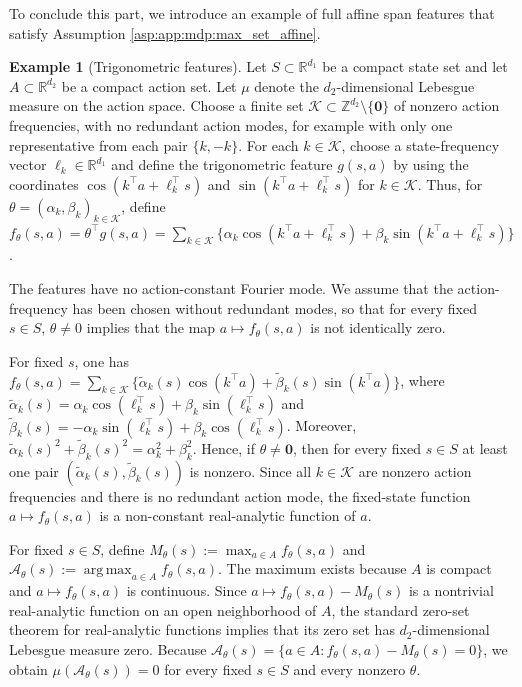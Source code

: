 \documentclass{amsart}
\theoremstyle{definition}
\newtheorem{example}{Example}
\begin{document}
To conclude this part, we introduce an example of full affine span features that satisfy Assumption \ref{asp:app:mdp:max_set_affine}. 

\begin{example}[Trigonometric features]\label{ex:trig_func_mdp}
Let $S\subset\mathbb R^{d_1}$ be a compact state set and let $A\subset\mathbb R^{d_2}$ be a compact action set. 
Let $\mu$ denote the $d_2$-dimensional Lebesgue measure on the action space. 
Choose a finite set $\mathcal K\subset\mathbb Z^{d_2}\setminus\{\mathbf 0\}$ of nonzero action frequencies, with no redundant action modes, for example with only one representative from each pair $\{k,-k\}$. 
For each $k\in\mathcal K$, choose a state-frequency vector $\ell_k\in\mathbb R^{d_1}$ and define the trigonometric feature $g(s,a)$ by using the coordinates $\cos(k^\top a+\ell_k^\top s)$ and $\sin(k^\top a+\ell_k^\top s)$ for $k\in\mathcal K$. 
Thus, for $\theta=(\alpha_k,\beta_k)_{k\in\mathcal K}$, define
$f_\theta(s,a)=\theta^\top g(s,a)=\sum_{k\in\mathcal K}\{\alpha_k\cos(k^\top a+\ell_k^\top s)+\beta_k\sin(k^\top a+\ell_k^\top s)\}$.

The features have no action-constant Fourier mode. 
We assume that the action-frequency has been chosen without redundant modes, so that for every fixed $s\in S$, $\theta\neq0$ implies that the map $a\mapsto f_\theta(s,a)$ is not identically zero. 

For fixed $s$, one has $f_\theta(s,a)=\sum_{k\in\mathcal K}\{\widetilde\alpha_k(s)\cos(k^\top a)+\widetilde\beta_k(s)\sin(k^\top a)\}$, where $\widetilde\alpha_k(s)=\alpha_k\cos(\ell_k^\top s)+\beta_k\sin(\ell_k^\top s)$ and $\widetilde\beta_k(s)=-\alpha_k\sin(\ell_k^\top s)+\beta_k\cos(\ell_k^\top s)$. 
Moreover, $\widetilde\alpha_k(s)^2+\widetilde\beta_k(s)^2=\alpha_k^2+\beta_k^2$. 
Hence, if $\theta\neq \mathbf 0$, then for every fixed $s\in S$ at least one pair $(\widetilde\alpha_k(s),\widetilde\beta_k(s))$ is nonzero.
Since all $k\in\mathcal K$ are nonzero action frequencies and there is no redundant action mode, the fixed-state function $a\mapsto f_\theta(s,a)$ is a non-constant real-analytic function of $a$.

For fixed $s\in S$, define $M_\theta(s):=\max_{a\in A} f_\theta(s,a)$ and $\mathcal A_\theta(s):=\operatorname*{arg\,max}_{a\in A} f_\theta(s,a)$. 
The maximum exists because $A$ is compact and $a\mapsto f_\theta(s,a)$ is continuous.
Since $a\mapsto f_\theta(s,a)-M_\theta(s)$ is a nontrivial real-analytic function on an open neighborhood of $A$, the standard zero-set theorem for real-analytic functions implies that its zero set has $d_2$-dimensional Lebesgue measure zero. 
Because $\mathcal A_\theta(s)=\{a\in A:f_\theta(s,a)-M_\theta(s)=0\}$, we obtain $\mu(\mathcal A_\theta(s))=0$ for every fixed $s\in S$ and every nonzero $\theta$.
\end{example}
\end{document}
